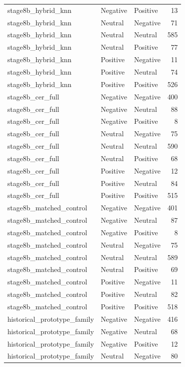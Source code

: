 \begin{tabular}{lllr}
stage8b_hybrid_knn & Negative & Positive & 13 \\
stage8b_hybrid_knn & Neutral & Negative & 71 \\
stage8b_hybrid_knn & Neutral & Neutral & 585 \\
stage8b_hybrid_knn & Neutral & Positive & 77 \\
stage8b_hybrid_knn & Positive & Negative & 11 \\
stage8b_hybrid_knn & Positive & Neutral & 74 \\
stage8b_hybrid_knn & Positive & Positive & 526 \\
stage8b_cer_full & Negative & Negative & 400 \\
stage8b_cer_full & Negative & Neutral & 88 \\
stage8b_cer_full & Negative & Positive & 8 \\
stage8b_cer_full & Neutral & Negative & 75 \\
stage8b_cer_full & Neutral & Neutral & 590 \\
stage8b_cer_full & Neutral & Positive & 68 \\
stage8b_cer_full & Positive & Negative & 12 \\
stage8b_cer_full & Positive & Neutral & 84 \\
stage8b_cer_full & Positive & Positive & 515 \\
stage8b_matched_control & Negative & Negative & 401 \\
stage8b_matched_control & Negative & Neutral & 87 \\
stage8b_matched_control & Negative & Positive & 8 \\
stage8b_matched_control & Neutral & Negative & 75 \\
stage8b_matched_control & Neutral & Neutral & 589 \\
stage8b_matched_control & Neutral & Positive & 69 \\
stage8b_matched_control & Positive & Negative & 11 \\
stage8b_matched_control & Positive & Neutral & 82 \\
stage8b_matched_control & Positive & Positive & 518 \\
historical_prototype_family & Negative & Negative & 416 \\
historical_prototype_family & Negative & Neutral & 68 \\
historical_prototype_family & Negative & Positive & 12 \\
historical_prototype_family & Neutral & Negative & 80 \\

\end{tabular}
